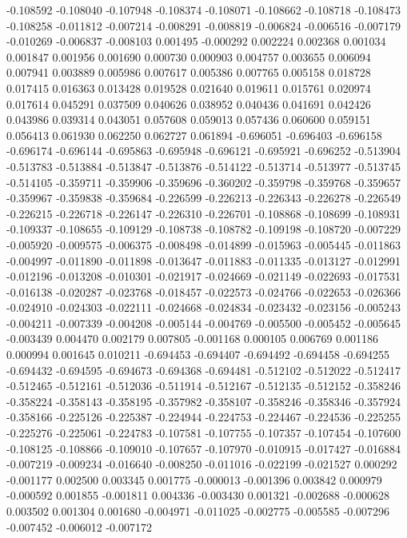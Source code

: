 -0.108592
-0.108040
-0.107948
-0.108374
-0.108071
-0.108662
-0.108718
-0.108473
-0.108258
-0.011812
-0.007214
-0.008291
-0.008819
-0.006824
-0.006516
-0.007179
-0.010269
-0.006837
-0.008103
0.001495
-0.000292
0.002224
0.002368
0.001034
0.001847
0.001956
0.001690
0.000730
0.000903
0.004757
0.003655
0.006094
0.007941
0.003889
0.005986
0.007617
0.005386
0.007765
0.005158
0.018728
0.017415
0.016363
0.013428
0.019528
0.021640
0.019611
0.015761
0.020974
0.017614
0.045291
0.037509
0.040626
0.038952
0.040436
0.041691
0.042426
0.043986
0.039314
0.043051
0.057608
0.059013
0.057436
0.060600
0.059151
0.056413
0.061930
0.062250
0.062727
0.061894
-0.696051
-0.696403
-0.696158
-0.696174
-0.696144
-0.695863
-0.695948
-0.696121
-0.695921
-0.696252
-0.513904
-0.513783
-0.513884
-0.513847
-0.513876
-0.514122
-0.513714
-0.513977
-0.513745
-0.514105
-0.359711
-0.359906
-0.359696
-0.360202
-0.359798
-0.359768
-0.359657
-0.359967
-0.359838
-0.359684
-0.226599
-0.226213
-0.226343
-0.226278
-0.226549
-0.226215
-0.226718
-0.226147
-0.226310
-0.226701
-0.108868
-0.108699
-0.108931
-0.109337
-0.108655
-0.109129
-0.108738
-0.108782
-0.109198
-0.108720
-0.007229
-0.005920
-0.009575
-0.006375
-0.008498
-0.014899
-0.015963
-0.005445
-0.011863
-0.004997
-0.011890
-0.011898
-0.013647
-0.011883
-0.011335
-0.013127
-0.012991
-0.012196
-0.013208
-0.010301
-0.021917
-0.024669
-0.021149
-0.022693
-0.017531
-0.016138
-0.020287
-0.023768
-0.018457
-0.022573
-0.024766
-0.022653
-0.026366
-0.024910
-0.024303
-0.022111
-0.024668
-0.024834
-0.023432
-0.023156
-0.005243
-0.004211
-0.007339
-0.004208
-0.005144
-0.004769
-0.005500
-0.005452
-0.005645
-0.003439
0.004470
0.002179
0.007805
-0.001168
0.000105
0.006769
0.001186
0.000994
0.001645
0.010211
-0.694453
-0.694407
-0.694492
-0.694458
-0.694255
-0.694432
-0.694595
-0.694673
-0.694368
-0.694481
-0.512102
-0.512022
-0.512417
-0.512465
-0.512161
-0.512036
-0.511914
-0.512167
-0.512135
-0.512152
-0.358246
-0.358224
-0.358143
-0.358195
-0.357982
-0.358107
-0.358246
-0.358346
-0.357924
-0.358166
-0.225126
-0.225387
-0.224944
-0.224753
-0.224467
-0.224536
-0.225255
-0.225276
-0.225061
-0.224783
-0.107581
-0.107755
-0.107357
-0.107454
-0.107600
-0.108125
-0.108866
-0.109010
-0.107657
-0.107970
-0.010915
-0.017427
-0.016884
-0.007219
-0.009234
-0.016640
-0.008250
-0.011016
-0.022199
-0.021527
0.000292
-0.001177
0.002500
0.003345
0.001775
-0.000013
-0.001396
0.003842
0.000979
-0.000592
0.001855
-0.001811
0.004336
-0.003430
0.001321
-0.002688
-0.000628
0.003502
0.001304
0.001680
-0.004971
-0.011025
-0.002775
-0.005585
-0.007296
-0.007452
-0.006012
-0.007172

